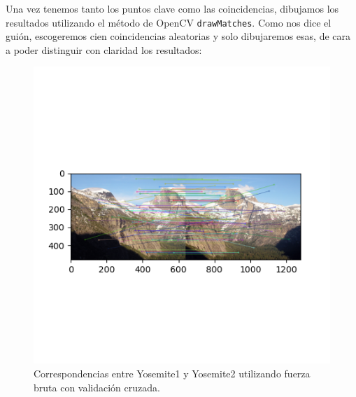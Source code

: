 \documentclass[12pt, spanish]{article}
\begin{document}
Una vez tenemos tanto los puntos clave como las coincidencias, dibujamos los resultados utilizando el método de OpenCV \texttt{drawMatches}. Como nos dice el guión, escogeremos cien coincidencias aleatorias y solo dibujaremos esas, de cara a poder distinguir con claridad los resultados:

\begin{figure}[H]
  \centering
      \includegraphics[width=\textwidth]{correspondencias_fuerza_bruta.png}
 		\caption{Correspondencias entre Yosemite1 y Yosemite2 utilizando fuerza bruta con validación cruzada.}
\end{figure}
\end{document}

